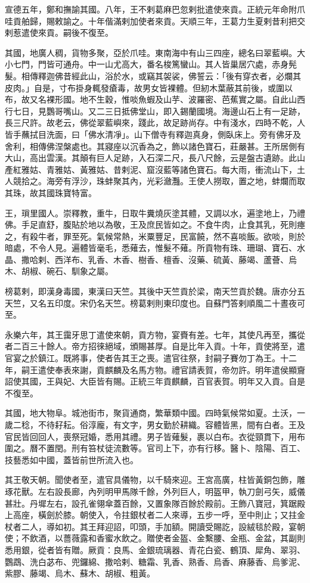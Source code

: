 \begin{pinyinscope}
宣德五年，鄭和撫諭其國。八年，王不剌葛麻巴忽剌批遣使來貢。正統元年命附爪哇貢舶歸，賜敕諭之。十年偕滿剌加使者來貢。天順三年，王葛力生夏剌昔利把交剌惹遣使來貢。嗣後不復至。

其國，地廣人稠，貨物多聚，亞於爪哇。東南海中有山三四座，總名曰翠藍嶼。大小七門，門皆可通舟。中一山尤高大，番名梭篤蠻山。其人皆巢居穴處，赤身髡髮。相傳釋迦佛昔經此山，浴於水，或竊其袈裟，佛誓云：「後有穿衣者，必爛其皮肉。」自是，寸布掛身輒發瘡毒，故男女皆裸體。但紉木葉蔽其前後，或圍以布，故又名裸形國。地不生穀，惟啖魚蝦及山芋、波羅密、芭蕉實之屬。自此山西行七日，見鸚哥嘴山。又二三日抵佛堂山，即入錫蘭國境。海邊山石上有一足跡，長三尺許。故老云，佛從翠藍嶼來，踐此，故足跡尚存。中有淺水，四時不乾，人皆手蘸拭目洗面，曰「佛水清凈」。山下僧寺有釋迦真身，側臥床上。旁有佛牙及舍利，相傳佛涅槃處也。其寢座以沉香為之，飾以諸色寶石，莊嚴甚。王所居側有大山，高出雲漢。其顛有巨人足跡，入石深二尺，長八尺餘，云是盤古遺跡。此山產紅雅姑、青雅姑、黃雅姑、昔剌泥、窟沒藍等諸色寶石。每大雨，衝流山下，土人競拾之。海旁有浮沙，珠蚌聚其內，光彩瀲灩。王使人撈取，置之地，蚌爛而取其珠，故其國珠寶特富。

王，瑣里國人。崇釋教，重牛，日取牛糞燒灰塗其體，又調以水，遍塗地上，乃禮佛。手足直舒，腹貼於地以為敬，王及庶民皆如之。不食牛肉，止食其乳，死則瘞之，有殺牛者，罪至死。氣候常熱，米粟豐足，民富饒，然不喜啖飯。欲啖，則於暗處，不令人見。遍體皆毫毛，悉薙去，惟髮不薙。所貢物有珠、珊瑚、寶石、水晶、撒哈剌、西洋布、乳香、木香、樹香、檀香、沒藥、硫黃、藤竭、蘆薈、烏木、胡椒、碗石、馴象之屬。

榜葛剌，即漢身毒國，東漢曰天竺。其後中天竺貢於梁，南天竺貢於魏。唐亦分五天竺，又名五印度。宋仍名天竺。榜葛剌則東印度也。自蘇門答剌順風二十晝夜可至。

永樂六年，其王靄牙思丁遣使來朝，貢方物，宴賚有差。七年，其使凡再至，攜從者二百三十餘人。帝方招徠絕域，頒賜甚厚。自是比年入貢。十年，貢使將至，遣官宴之於鎮江。既將事，使者告其王之喪。遣官往祭，封嗣子賽勿丁為王。十二年，嗣王遣使奉表來謝，貢麒麟及名馬方物。禮官請表賀，帝勿許。明年遣侯顯齎詔使其國，王與妃、大臣皆有賜。正統三年貢麒麟，百官表賀。明年又入貢。自是不復至。

其國，地大物阜。城池街市，聚貨通商，繁華類中國。四時氣候常如夏。土沃，一歲二稔，不待耔耘。俗淳龐，有文字，男女勤於耕織。容體皆黑，間有白者。王及官民皆回回人，喪祭冠婚，悉用其禮。男子皆薙髮，裹以白布。衣從頸貫下，用布圍之。曆不置閏。刑有笞杖徒流數等。官司上下，亦有行移。醫卜、陰陽、百工、技藝悉如中國，蓋皆前世所流入也。

其王敬天朝。聞使者至，遣官具儀物，以千騎來迎。王宮高廣，柱皆黃銅包飾，雕琢花獸。左右設長廊，內列明甲馬隊千餘，外列巨人，明盔甲，執刀劍弓矢，威儀甚壯。丹墀左右，設孔雀翎傘蓋百餘，又置象隊百餘於殿前。王飾八寶冠，箕踞殿上高座，橫劍於膝。朝使入，令拄銀杖者二人來導，五步一呼，至中則止；又拄金杖者二人，導如初。其王拜迎詔，叩頭，手加額。開讀受賜訖，設絨毯於殿，宴朝使；不飲酒，以薔薇露和香蜜水飲之。贈使者金盔、金繫腰、金瓶、金盆，其副則悉用銀，從者皆有贈。厥貢：良馬、金銀琉璃器、青花白瓷、鶴頂、犀角、翠羽、鸚鵡、洗白苾布、兜鑼綿、撒哈剌、糖霜、乳香、熟香、烏香、麻藤香、烏爹泥、紫膠、藤竭、烏木、蘇木、胡椒、粗黃。


\end{pinyinscope}
